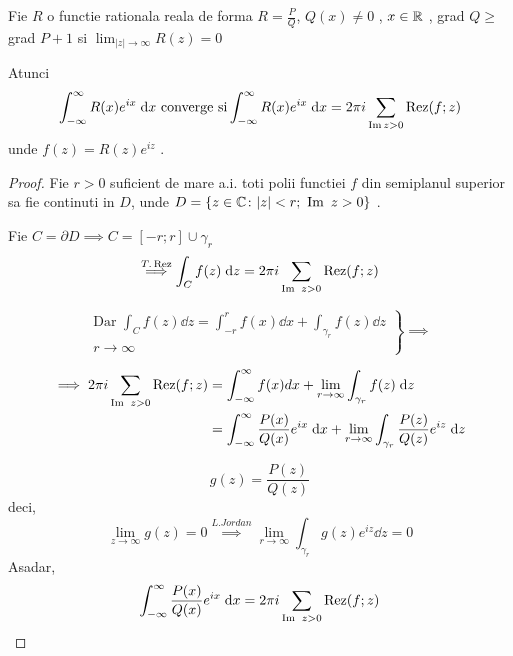 \begin{tip}
    Fie $R$ o functie rationala reala de forma
             $\displaystyle R = \frac{P}{Q}$,
             $Q(x) \neq 0$ ,
             $ x \in \mathbb{R}$ ,
             grad $Q \geq $ grad  $P+1$ si
             $\displaystyle \lim_{|z|\to\infty} R(z) = 0  $

             Atunci
             \[
                    \int_{- \infty}^{\infty} R(x) e^{ix} \; \mathrm{d} x \text{ converge si}
                    \int_{- \infty}^{\infty} R(x) e^{ix} \; \mathrm{d} x = 2 \pi i \sum_{\operatorname{Im} z >0} \operatorname{Rez}(f;z)
              \]
            unde $f(z) = R(z) e^{iz}$ .

    \begin{proof}
        Fie $r>0$ suficient de mare a.i. toti polii functiei $f$ din semiplanul superior
        sa fie continuti in $D$, unde $D=\{z\in\mathbb{C} \colon |z| < r ;\ \operatorname{Im}\ z >0\}$ .

        Fie $C = \partial D \implies C = [-r;r] \cup \gamma_r$
        \[
            \overset{T.\operatorname{Rez}}{\implies} \int_{C} f(z) \; \mathrm{d} z = 2 \pi i \sum_{\operatorname{Im}\ z >0} \operatorname{Rez}(f;z)
        \]

        \begin{displaymath}
            \left.
                \begin{aligned}
                    \text{Dar } \int_{C} f(z) \dd z
                        = \int_{-r}^{r} f(x) \dd x + \int_{\gamma_r} f(z) \dd z \\
                        r \to \infty
                \end{aligned}
            \right \}
            \implies
        \end{displaymath}

        \begin{align*}
            \implies 2\pi i \sum_{\operatorname{Im}\ z >0 } \operatorname{Rez}(f;z)
                &= \int_{-\infty}^{\infty} f(x) dx + \lim_{r\to\infty} \int_{\gamma_r} f(z) \; \mathrm{d} z
            \\
                &= \int_{-\infty}^{\infty} \frac{P(x)}{Q(x)} e^{ix} \; \mathrm{d} x
                   + \lim_{r\to\infty} \int_{\gamma_r} \frac{P(z)}{Q(z)} e^{iz} \; \mathrm{d} z
        \end{align*}

        \[
            g(z) = \frac{P(z)}{Q(z)}
        \]
        deci,
        \[
            \lim_{z\to\infty}g(z) = 0 \overset{L.Jordan}{\implies}
            \lim_{r\to\infty} \int_{\gamma_r} g(z) e^{iz} \dd z = 0
        \]
        Asadar,
        \[
            \int_{-\infty}^{\infty} \frac{P(x)}{Q(x)} e^{ix} \; \mathrm{d} x
                =2 \pi i \sum_{\operatorname{Im}\ z >0} \operatorname{Rez}(f;z)
        \]
    \end{proof}
\end{tip}

